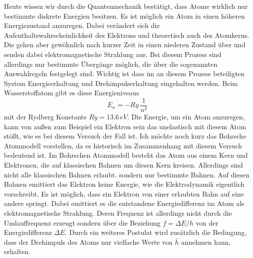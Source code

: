 \documentclass[a4paper, 12pt]{scrartcl}
\begin{document}
Heute wissen wir durch die Quantenmechanik bestätigt, dass Atome wirklich nur bestimmte diskrete Energien besitzen. Es ist möglich ein Atom in einen höheren Energiezustand anzuregen. Dabei verändert sich die Aufenthaltswahrscheinlichkeit des Elektrons und theoretisch auch des Atomkerns. Die gehen aber gewöhnlich nach kurzer Zeit in einen niederen Zustand über und senden dabei elektromagnetische Strahlung aus. Bei diesem Prozess sind allerdings nur bestimmte Übergänge möglich, die über die sogenannten Auswahlregeln festgelegt sind. Wichtig ist dass im an diesem Prozess beteiligten System Energieerhaltung und Drehimpulserhaltung eingehalten werden.
Beim Wasserstoffatom gibt es diese Energieniveaus 
\begin{equation*}E_n=-Ry\,\frac{1}{n^2}\end{equation*}
mit der Rydberg Konstante $Ry=13.6\,eV$. Die Energie, um ein Atom anzuregen, kann von außen zum Beispiel ein Elektron sein das unelastisch mit diesem Atom stößt, wie es bei diesem Versuch der Fall ist.
Ich möchte noch kurz das Bohrsche Atommodell vorstellen, da es historisch im Zusammenhang mit diesem Versuch bedeutend ist. Im Bohrschen Atommodell besteht das Atom aus einem Kern und Elektronen, die auf klassischen Bahnen um diesen Kern kreisen. Allerdings sind nicht alle klassischen Bahnen erlaubt. sondern nur bestimmte Bahnen. Auf diesen Bahnen emittiert das Elektron keine Energie, wie die Elektrodynamik eigentlich vorschreibt. Es ist möglich, dass ein Elektron von einer erlaubten Bahn auf eine andere springt. Dabei emittiert es die entstandene Energiedifferenz im Atom als elektromagnetische Strahlung. Deren Frequenz ist allerdings nicht durch die Umlauffrequenz erzeugt sondern über die Beziehung $f=\Delta{E}/h$ von der Energiedifferenz $\Delta{E}$. Durch ein weiteres Postulat wird zusätzlich die Bedingung, dass der Drehimpuls des Atoms nur vielfache Werte von $\bar{h}$ annehmen kann, erhalten.
\end{document}
